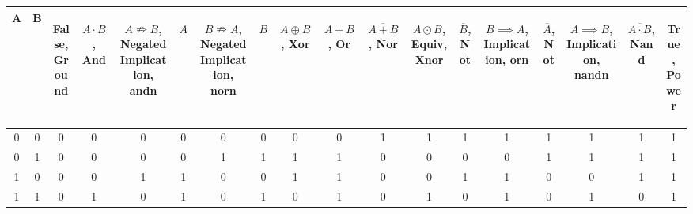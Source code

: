 \begin{tabular}{c|c||c|c|c|c|c|c|c|c|c|c|c|c|c|c|c|c}
A & B & \begin{sideways}False, Ground\end{sideways}%
& \begin{sideways}$A\cdot B$, And\end{sideways}%
& \begin{sideways}$A\nRightarrow B$, Negated Implication, andn \end{sideways}%
& \begin{sideways}$A$\end{sideways}%
& \begin{sideways}$B\nRightarrow A$, Negated Implication, norn\end{sideways}%
& \begin{sideways}$B$\end{sideways}%
& \begin{sideways}$A\oplus B$, Xor\end{sideways}%
& \begin{sideways}$A+B$, Or\end{sideways}%
& \begin{sideways}$\overline{A+B}$, Nor\end{sideways}%
& \begin{sideways}$A\odot B$, Equiv, Xnor\end{sideways}%
& \begin{sideways}$\overline{B}$, Not\end{sideways}%
& \begin{sideways}$B\implies A$, Implication, orn\end{sideways}%
& \begin{sideways}$\overline{A}$, Not\end{sideways}%
& \begin{sideways}$A\implies B$, Implication, nandn\end{sideways}%
& \begin{sideways}$\overline{A\cdot B}$, Nand\end{sideways}%
& \begin{sideways}True, Power\end{sideways}%
\\\hline
0 & 0 & 0 & 0 & 0 & 0 & 0 & 0 & 0 & 0 & 1 & 1 & 1 & 1 & 1 & 1 & 1 & 1 \\
0 & 1 & 0 & 0 & 0 & 0 & 1 & 1 & 1 & 1 & 0 & 0 & 0 & 0 & 1 & 1 & 1 & 1 \\
1 & 0 & 0 & 0 & 1 & 1 & 0 & 0 & 1 & 1 & 0 & 0 & 1 & 1 & 0 & 0 & 1 & 1 \\
1 & 1 & 0 & 1 & 0 & 1 & 0 & 1 & 0 & 1 & 0 & 1 & 0 & 1 & 0 & 1 & 0 & 1 \\
\end{tabular}
